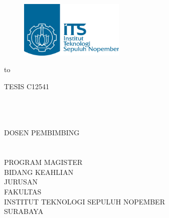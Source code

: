 \begin{titlepage}
    \begin{figure}
        \hspace{0.2cm}
        \includegraphics[width=5cm]{pics/logo.jpg}
    \end{figure}
    
    \noindent
    \colorbox{biruits}{\hbox to \textwidth{\hfill}}
    
    \vspace{1.5cm}
    \noindent
    TESIS C12541
    
    \noindent
    \bo{\JudulIndonesia} \\

    \noindent
    \penulis \\
    \nrp \\

    \noindent
    DOSEN PEMBIMBING \\
    \pembimbingSatu \\
    \pembimbingDua \\
    
    \vspace{1.5cm}
    \noindent
    PROGRAM MAGISTER \\
    BIDANG KEAHLIAN \Keahlian \\
    JURUSAN \Jurusan \\
    FAKULTAS \Fakultas \\
    INSTITUT TEKNOLOGI SEPULUH NOPEMBER \\
    SURABAYA \\
    \tahun \\
\end{titlepage}

